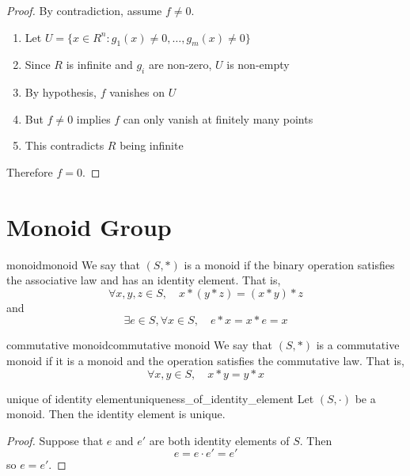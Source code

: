 \begin{proof}
  By contradiction, assume $f \neq 0$.
  \begin{enumerate}
    \item Let $U = \{x \in R^n : g_1(x) \neq 0,\ldots,g_m(x) \neq 0\}$
    \item Since $R$ is infinite and $g_i$ are non-zero, $U$ is non-empty
    \item By hypothesis, $f$ vanishes on $U$
    \item But $f \neq 0$ implies $f$ can only vanish at finitely many points
    \item This contradicts $R$ being infinite
  \end{enumerate}
  Therefore $f = 0$.
\end{proof}

\section{Monoid Group}

\begin{definition}{monoid}{monoid}
  We say that $(S, \ast)$ is a monoid if the binary operation satisfies the associative law and has an identity element. That is,
  \[
    \forall x, y, z \in S, \quad x \ast (y \ast z) = (x \ast y) \ast z
  \]
  and
  \[
    \exists e \in S, \forall x \in S, \quad e \ast x = x \ast e = x
  \]
\end{definition}

\begin{definition}{commutative monoid}{commutative monoid}
  We say that $(S, \ast)$ is a commutative monoid if it is a monoid and the operation satisfies the commutative law. That is,
  \[
    \forall x, y \in S, \quad x \ast y = y \ast x
  \]
\end{definition}

\begin{proposition}{unique of identity element}{uniqueness_of_identity_element}
  Let $(S, \cdot)$ be a monoid. Then the identity element is unique.
\end{proposition}
\begin{proof}
  Suppose that $e$ and $e'$ are both identity elements of $S$. Then
  \[
    e = e \cdot e' = e'
  \]
  so $e = e'$.
\end{proof}

